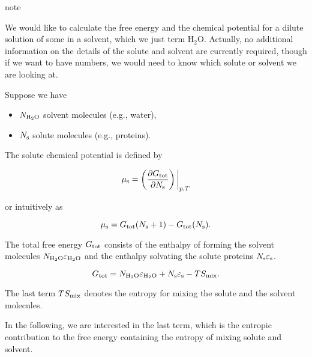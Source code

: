 \documentclass[letterpaper,10pt,english]{sphinxmanual}
\let\sphinxpxdimen\pdfpxdimen\else\newdimen\sphinxpxdimen
\begin{document}
\begin{sphinxadmonition}{note}{}\unskip
\sphinxAtStartPar
{}

\sphinxAtStartPar
We would like to calculate the free energy and the chemical potential for a dilute solution of some  in a solvent, which we just term H\(_2\)O. Actually, no additional information on the details of the solute and solvent are currently required, though if we want to have numbers, we would need to know which solute or solvent we are looking at.

\noindent\sphinxincludegraphics[width=300\sphinxpxdimen,height=299\sphinxpxdimen]{{solute_solvent}.png}

\sphinxAtStartPar
Suppose we have
\begin{itemize}
\item {} 
\sphinxAtStartPar
\(N_{\rm H_2 O}\) solvent molecules (e.g., water),

\item {} 
\sphinxAtStartPar
\(N_{\rm s}\) solute molecules (e.g., proteins).

\end{itemize}

\sphinxAtStartPar
The solute chemical potential is defined by

\sphinxAtStartPar
\begin{equation}
\mu_{\rm s}=\left( \frac{\partial G_{\rm tot}}{\partial N_{\rm s}}\right)\bigg|_{p,T}
\end{equation}

\sphinxAtStartPar
or intuitively as

\sphinxAtStartPar
\begin{equation}
\mu_{\rm s}=G_{\rm tot}(N_{\rm s}+1)-G_{\rm tot}(N_{\rm s}).
\end{equation}

\sphinxAtStartPar
The total free energy \(G_{\rm tot}\) consists of the enthalpy of forming the solvent molecules \(N_{\rm{H_{2}O}}\varepsilon_{\rm H_{2}O}\) and the enthalpy solvating the solute proteins \(N_{\rm s}\varepsilon_{\rm s}\).

\sphinxAtStartPar
\begin{equation}
G_{\rm tot}=N_{\rm{H_{2}O}}\varepsilon_{\rm H_{2}O}+N_{\rm s}\varepsilon_{\rm s}-TS_{\rm mix}.
\end{equation}

\begin{DUlineblock}{0em}
\item[] The last term \(TS_{\rm mix}\) denotes the entropy for mixing the solute and the solvent molecules.
\item[] In the following, we are interested in the last term, which is the entropic contribution to the free energy containing the entropy of mixing solute and solvent.
\end{DUlineblock}


\end{sphinxadmonition}
\end{document}
